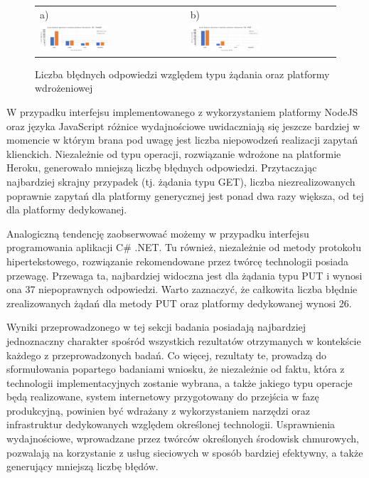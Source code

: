 \begin{figure}[htb]
  \centering
	\begin{tabular}{@{}ll@{}}
    a) & b) \\
    \includegraphics[width=0.49\textwidth]{rys05/nodejs-errors.pdf} & \includegraphics[width=0.49\textwidth]{rys05/dotnet-errors.pdf} \\
	\end{tabular}
  \caption{Liczba błędnych odpowiedzi względem typu żądania oraz platformy wdrożeniowej}
  \label{fig:errors-for-plaforms}
\end{figure}


W przypadku interfejsu implementowanego z wykorzystaniem platformy NodeJS oraz języka JavaScript różnice wydajnościowe uwidaczniają się jeszcze bardziej w momencie w którym brana pod uwagę jest liczba niepowodzeń realizacji zapytań klienckich. Niezależnie od typu operacji, rozwiązanie wdrożone na platformie Heroku, generowało mniejszą liczbę błędnych odpowiedzi. Przytaczając najbardziej skrajny przypadek (tj. żądania typu GET), liczba niezrealizowanych poprawnie zapytań dla platformy generycznej jest ponad dwa razy większa, od tej dla platformy dedykowanej.

Analogiczną tendencję zaobserwować możemy w przypadku interfejsu programowania aplikacji C\# .NET. Tu również, niezależnie od metody protokołu hipertekstowego, rozwiązanie rekomendowane przez twórcę technologii posiada przewagę. Przewaga ta, najbardziej widoczna jest dla żądania typu PUT i wynosi ona 37 niepoprawnych odpowiedzi. Warto zaznaczyć, że całkowita liczba błędnie zrealizowanych żądań dla metody PUT oraz platformy dedykowanej wynosi 26.

Wyniki przeprowadzonego w tej sekcji badania posiadają najbardziej jednoznaczny charakter spośród wszystkich rezultatów otrzymanych w kontekście każdego z przeprowadzonych badań. Co więcej, rezultaty te, prowadzą do sformułowania popartego badaniami wniosku, że niezależnie od faktu, która z technologii implementacyjnych zostanie wybrana, a także jakiego typu operacje będą realizowane, system internetowy przygotowany do przejścia w fazę produkcyjną, powinien być wdrażany z wykorzystaniem narzędzi oraz infrastruktur dedykowanych względem określonej technologii. Usprawnienia wydajnościowe, wprowadzane przez twórców określonych środowisk chmurowych, pozwalają na korzystanie z usług sieciowych w sposób bardziej efektywny, a także generujący mniejszą liczbę błędów.